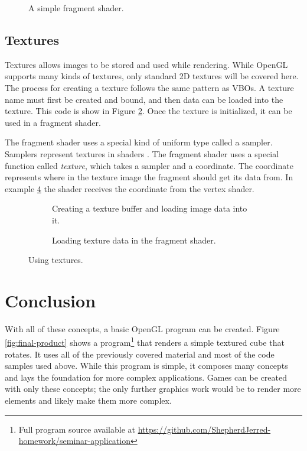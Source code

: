 \documentclass{article}
\begin{document}
\begin{figure}[h]
	
	\caption{A simple fragment shader.}
	\label{fig:fragment-shader}
\end{figure}

\subsection{Textures}
Textures allows images to be stored and used while rendering. While OpenGL supports many kinds of textures, only standard 2D textures will be covered here. The process for creating a texture follows the same pattern as VBOs. A texture name must first be created and bound, and then data can be loaded into the texture. This code is show in Figure \ref{fig:texture-init}. Once the texture is initialized, it can be used in a fragment shader.

The fragment shader uses a special kind of uniform type called a sampler. Samplers represent textures in shaders \cite{sellers2016}. The fragment shader uses a special function called \textit{texture}, which takes a sampler and a coordinate. The coordinate represents where in the texture image the fragment should get its data from. In example \ref{fig:texture-fragment} the shader receives the coordinate from the vertex shader.

\begin{figure}[h]
    \centering
    \begin{subfigure}[h]{0.49\textwidth}
        
        \caption{Creating a texture buffer and loading image data into it.}
        \label{fig:texture-init}
    \end{subfigure}
    \begin{subfigure}[h]{0.49\textwidth}
        
        \caption{Loading texture data in the fragment shader.}
        \label{fig:square-indexed}
    \end{subfigure}
	\caption{Using textures.}
	\label{fig:texture-fragment}
\end{figure}

\section{Conclusion}
With all of these concepts, a basic OpenGL program can be created. Figure \ref{fig:final-product} shows a program\footnote{Full program source available at \url{https://github.com/ShepherdJerred-homework/seminar-application}} that renders a simple textured cube that rotates. It uses all of the previously covered material and most of the code samples used above. While this program is simple, it composes many concepts and lays the foundation for more complex applications. Games can be created with only these concepts; the only further graphics work would be to render more elements and likely make them more complex.
\end{document}
